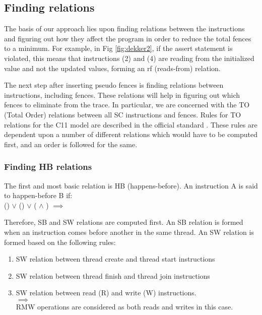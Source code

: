 \subsection{Finding relations}
The basis of our approach lies upon finding relations between the instructions and figuring out how they affect the program in order to reduce the total fences to a minimum. For example, in Fig \ref{fig:dekker2}, if the assert statement is violated, this means that instructions (2) and (4) are reading from the initialized value and not the updated values, forming an rf (reads-from) relation.

\par
The next step after inserting pseudo fences is finding relations between instructions, including fences. These relations will help in figuring out which fences to eliminate from the trace. In particular, we are concerned with the TO (Total Order) relations between all SC instructions and fences. Rules for TO relations for the C11 model are described in the official standard . These rules are dependent upon a number of different relations which would have to be computed first, and an order is followed for the same.

\subsubsection{Finding HB relations}
The first and most basic relation is HB (happens-before). An instruction A is said to happen-before B if:\\
() $\lor$ () $\lor$ ( $\land$ ) $\implies$ 

\par
Therefore, SB and SW relations are computed first. An SB relation is formed when an instruction comes before another in the same thread. An SW relation is formed based on the following rules:
\begin{enumerate}
\item SW relation between thread create and thread start instructions\\

\item SW relation between thread finish and thread join instructions\\

\item SW relation between read (R) and write (W) instructions.\\
 $\implies$ \\
RMW operations are considered as both reads and writes in this case.
\end{enumerate}

